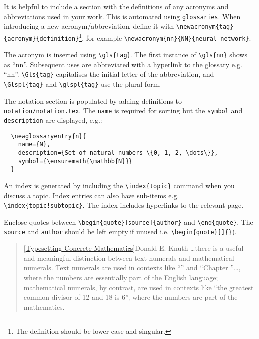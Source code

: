 

It is helpful to include a section with the definitions of any acronyms and abbreviations
used in your work. This is automated using \href{https://ctan.org/pkg/glossaries}{\texttt{glossaries}}.
When introducing a new acronym/abbreviation, define it with \verb|\newacronym{tag}{acronym}{definition}|\footnote{The 
definition should be lower case and singular.}, for example \verb|\newacronym{nn}{NN}{neural network}|.

The acronym is inserted using \verb|\gls{tag}|. The first instance of \verb|\gls{nn}| shows
as ``\gls{nn}''. Subsequent uses are abbreviated with a hyperlink to the glossary e.g. ``\gls{nn}''.
\verb|\Gls{tag}| capitalises the initial letter of the abbreviation, and \verb|\Glspl{tag}|
and \verb|\glspl{tag}| use the plural form.

The notation section is populated by adding definitions to \texttt{notation/notation.tex}. The \texttt{name} is required for sorting but the \texttt{symbol} and \texttt{description} are displayed, e.g.:
\begin{verbatim}
  \newglossaryentry{n}{
    name={N},
    description={Set of natural numbers \{0, 1, 2, \dots\}},
    symbol={\ensuremath{\mathbb{N}}}
  }
\end{verbatim}


An index is generated by including the \verb|\index{topic}| command when you discuss a topic.
Index entries can also have sub-items e.g. \verb|\index{topic!subtopic}|. The index includes
hyperlinks to the relevant page.


Enclose quotes between \verb|\begin{quote}[source]{author}| and \verb|\end{quote}|. The
\texttt{source} and \texttt{author} should be left empty if unused i.e. \verb|\begin{quote}[]{}|).

\begin{quote}[\href{https://www.tug.org/TUGboat/Articles/tb10-1/tb23knut.pdf}{Typesetting Concrete Mathematics}]{Donald E. Knuth}
  \dots there is a useful and meaningful distinction between text numerals and mathematical
  numerals. Text numerals are used in contexts like ``'' and ``Chapter ''\dots,
  where the numbers are essentially part of the English language; mathematical numerals, by contrast,
  are used in contexts like ``the greatest common divisor of 12 and 18 is 6'', where the numbers
  are part of the mathematics.
\end{quote}

